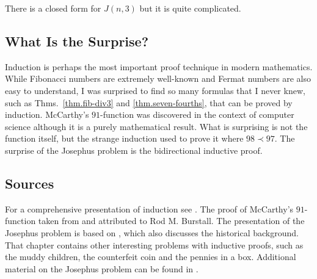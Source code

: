 There is a closed form for $J(n,3)$ but it is quite complicated.


\subsection*{What Is the Surprise?}

Induction is perhaps the most important proof technique in modern mathematics. While Fibonacci numbers are extremely well-known and Fermat numbers are also easy to understand, I was surprised to find so many formulas that I never knew, such as Thms.~\ref{thm.fib-div3} and \ref{thm.seven-fourths}, that can be proved by induction. McCarthy's $91$-function was discovered in the context of computer science although it is a purely mathematical result. What is surprising is not the function itself, but the strange induction used to prove it where $98\prec 97$. The surprise of the Josephus problem is the bidirectional inductive proof.

\subsection*{Sources}

For a comprehensive presentation of induction see \cite{gunderson}. The proof of McCarthy's $91$-function taken from \cite{manna} and attributed to Rod M. Burstall. The presentation of the Josephus problem is based on \cite[Chapter~17]{gunderson}, which also discusses the historical background. That chapter contains other interesting problems with inductive proofs, such as the muddy children, the counterfeit coin and the pennies in a box. Additional material on the Josephus problem can be found in \cite{schumer,wiki:josephus}.

